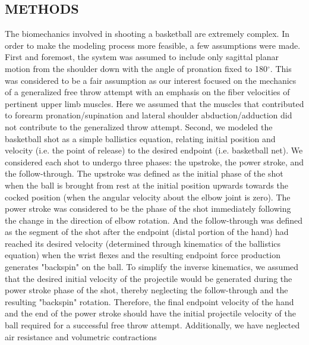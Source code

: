 \documentclass[12pt]{article}
\begin{document}
\begin{multicols}{2}
\section*{METHODS}
The biomechanics involved in shooting a basketball are extremely complex. In order to make the modeling process more feasible, a few assumptions were made. First and foremost, the system was assumed to include only sagittal planar motion from the shoulder down with the angle of pronation fixed to 180$^{\circ}$. This was considered to be a fair assumption as our interest focused on the mechanics of a generalized free throw attempt with an emphasis on the fiber velocities of pertinent upper limb muscles. Here we assumed that the muscles that contributed to forearm pronation/supination and lateral shoulder abduction/adduction did not contribute to the generalized throw attempt. Second, we modeled the basketball shot as a simple ballistics equation, relating initial position and velocity (i.e. the point of release) to the desired endpoint (i.e. basketball net). \linebreak
We considered each shot to undergo three phases: the upstroke, the power stroke, and the follow-through. The upstroke was defined as the initial phase of the shot when the ball is brought from rest at the initial position upwards towards the cocked position (when the angular velocity about the elbow joint is zero). The power stroke was considered to be the phase of the shot immediately following the change in the direction of elbow rotation. And the follow-through was defined as the segment of the shot after the endpoint (distal portion of the hand) had reached its desired velocity (determined through kinematics of the ballistics equation) when the wrist flexes and the resulting endpoint force production generates "backspin" on the ball. To simplify the inverse kinematics, we assumed that the desired initial velocity of the projectile would be generated during the power stroke phase of the shot, thereby neglecting the follow-through and the resulting "backspin" rotation. Therefore, the final endpoint velocity of the hand and the end of the power stroke should have the initial projectile velocity of the ball required for a successful free throw attempt. Additionally, we have neglected air resistance and volumetric contractions
\end{multicols}
\end{document}
